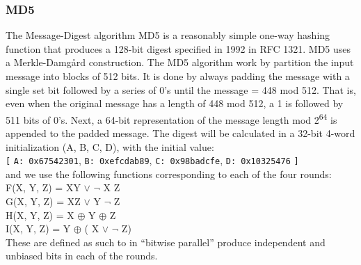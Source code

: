 \documentclass[11pt]{article}
\begin{document}
\subsubsection{MD5}
\label{sec:org15e1ca9}
The Message-Digest algorithm MD5 is a reasonably simple one-way hashing function that produces a 128-bit digest specified in 1992 in RFC 1321\cite{}. MD5 uses a Merkle-Damgård construction.
The MD5 algorithm work by partition the input message into blocks of 512 bits. It is done by always padding the message with a single set bit followed by a series of 0's until the message = 448 mod 512. That is, even when the original message has a length of 448 mod 512, a 1 is followed by 511 bits of 0's.
Next, a 64-bit representation of the message length mod 2\textsuperscript{64} is appended to the padded message.
The digest will be calculated in a 32-bit 4-word initialization (A, B, C, D), with the initial value:\\
\texttt{[} \texttt{A: 0x67542301}, \texttt{B: 0xefcdab89}, \texttt{C: 0x98badcfe}, \texttt{D: 0x10325476} \texttt{]}\\
and we use the following functions corresponding to each of the four rounds:\\
F(X, Y, Z) = XY \(\vee\) \(\neg{}\) X Z\\
G(X, Y, Z) = XZ \(\vee\) Y \(\neg{}\) Z\\
H(X, Y, Z) = X \(\oplus\) Y \(\oplus\) Z\\
I(X, Y, Z) = Y \(\oplus\) ( X \(\vee\) \(\neg{}\) Z)\\
These are defined as such to in ``bitwise parallel'' produce independent and unbiased bits in each of the rounds.
\end{document}
